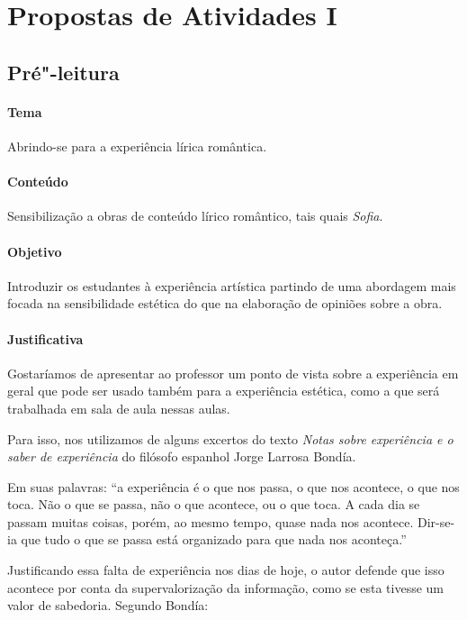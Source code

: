 \documentclass[12pt]{extarticle}
\begin{document}


\pagebreak\section{Propostas de Atividades I}

\subsection{Pré"-leitura}

\paragraph{Tema} Abrindo-se para a experiência lírica romântica.

\paragraph{Conteúdo} Sensibilização a obras de conteúdo lírico romântico,
tais quais \emph{Sofia}.

\paragraph{Objetivo} Introduzir os estudantes à experiência artística
partindo de uma abordagem mais focada na sensibilidade estética do que
na elaboração de opiniões sobre a obra. 

\paragraph{Justificativa} Gostaríamos de apresentar ao professor um
ponto de vista sobre a experiência em geral que pode ser usado
também para a experiência estética, como a que será trabalhada em 
sala de aula nessas aulas. 

Para isso, nos utilizamos de alguns excertos do texto \emph{Notas sobre
experiência e o saber de experiência} do filósofo espanhol Jorge
Larrosa Bondía. 

Em suas palavras: ``a experiência é o que nos passa, 
o que nos acontece, o que nos toca. Não o que se passa, não o que acontece, ou o que toca. A cada dia se 
passam muitas coisas, porém, ao mesmo tempo, quase nada nos acontece. 
Dir-se-ia que tudo o que se passa está organizado para que nada nos aconteça.''

Justificando essa falta de experiência nos dias de hoje, 
o autor defende que isso acontece por conta da supervalorização
da informação, como se esta tivesse um valor de sabedoria. Segundo Bondía: 
\end{document}
